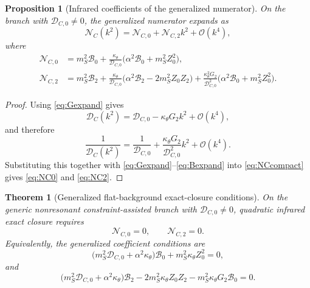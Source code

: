 \documentclass[11pt]{article}
\newtheorem{proposition}{Proposition}
\newtheorem{theorem}{Theorem}
\begin{document}
\begin{proposition}[Infrared coefficients of the generalized numerator]
On the branch with \(\mathcal D_{C,0}\neq0\), the generalized numerator expands as
\begin{equation}
\mathcal N_C(k^2)
=
\mathcal N_{C,0}
+\mathcal N_{C,2}k^2
+\mathcal O(k^4),
\label{eq:NCexpand}
\end{equation}
where
\begin{align}
\mathcal N_{C,0}
&=
m_S^2\mathcal B_0
+\frac{\kappa_\theta}{\mathcal D_{C,0}}
\bigl(\alpha^2\mathcal B_0+m_S^2Z_0^2\bigr),
\label{eq:NC0}
\\
\mathcal N_{C,2}
&=
m_S^2\mathcal B_2
+\frac{\kappa_\theta}{\mathcal D_{C,0}}
\bigl(\alpha^2\mathcal B_2-2m_S^2Z_0Z_2\bigr)
+\frac{\kappa_\theta^2G_2}{\mathcal D_{C,0}^2}
\bigl(\alpha^2\mathcal B_0+m_S^2Z_0^2\bigr).
\label{eq:NC2}
\end{align}
\end{proposition}

\begin{proof}
Using \eqref{eq:Gexpand} gives
\[
\mathcal D_C(k^2)
=
\mathcal D_{C,0}-\kappa_\theta G_2k^2+\mathcal O(k^4),
\]
and therefore
\[
\frac{1}{\mathcal D_C(k^2)}
=
\frac{1}{\mathcal D_{C,0}}
+\frac{\kappa_\theta G_2}{\mathcal D_{C,0}^2}k^2
+\mathcal O(k^4).
\]
Substituting this together with \eqref{eq:Gexpand}--\eqref{eq:Bexpand} into \eqref{eq:NCcompact} gives \eqref{eq:NC0} and \eqref{eq:NC2}.
\end{proof}

\begin{theorem}[Generalized flat-background exact-closure conditions]
On the generic nonresonant constraint-assisted branch with \(\mathcal D_{C,0}\neq0\), quadratic infrared exact closure requires
\begin{equation}
\mathcal N_{C,0}=0,
\qquad
\mathcal N_{C,2}=0.
\label{eq:NCconditions}
\end{equation}
Equivalently, the generalized coefficient conditions are
\begin{equation}
\bigl(m_S^2\mathcal D_{C,0}+\alpha^2\kappa_\theta\bigr)\mathcal B_0
+m_S^2\kappa_\theta Z_0^2
=
0,
\label{eq:gencond0}
\end{equation}
and
\begin{equation}
\bigl(m_S^2\mathcal D_{C,0}+\alpha^2\kappa_\theta\bigr)\mathcal B_2
-2m_S^2\kappa_\theta Z_0Z_2
-m_S^2\kappa_\theta G_2\mathcal B_0
=
0.
\label{eq:gencond2}
\end{equation}
\end{theorem}
\end{document}

